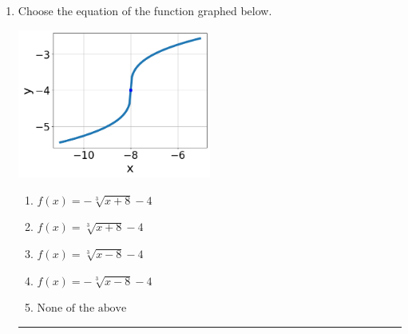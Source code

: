 \documentclass[14pt]{extbook}
\newcommand{\litem}[1]{\item#1\hspace*{-1cm}\rule{\textwidth}{0.4pt}}
\begin{document}
\begin{enumerate}
{\begin{enumerate}[label=\Alph*.]
\end{enumerate} }
\litem{
Choose the equation of the function graphed below.
\begin{center}
    \includegraphics[width=0.5\textwidth]{../Figures/radicalGraphToEquationCopyB.png}
\end{center}
\begin{enumerate}[label=\Alph*.]
\item \( f(x) = - \sqrt[3]{x + 8} - 4 \)
\item \( f(x) = \sqrt[3]{x + 8} - 4 \)
\item \( f(x) = \sqrt[3]{x - 8} - 4 \)
\item \( f(x) = - \sqrt[3]{x - 8} - 4 \)
\item \( \text{None of the above} \)

\end{enumerate} }
\end{enumerate}
\end{document}
